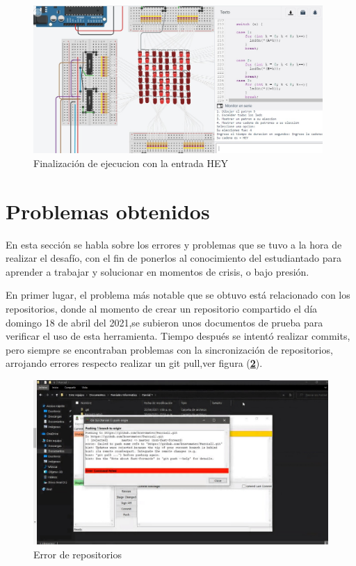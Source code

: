 \documentclass{article}
\begin{document}
       \begin{figure}[h]
    \includegraphics[width=11cm]{montaje7.jpeg}
    \centering
    \caption{Finalización de ejecucion con la entrada HEY}
    \label{ejecucionH}
    \end{figure}


\section{Problemas obtenidos}\label{problem}
En esta sección se habla sobre los errores y problemas que se tuvo a la hora de realizar el desafío, con el fin de ponerlos al conocimiento del estudiantado para aprender a trabajar y solucionar en momentos de crisis, o bajo presión.

En primer lugar, el problema más notable que se obtuvo está relacionado con los repositorios, donde al momento de crear un repositorio compartido el día domingo 18 de abril del 2021,se subieron unos documentos de prueba para verificar el uso de esta herramienta. Tiempo después se intentó  realizar commits, pero siempre se encontraban problemas con la sincronización de repositorios, arrojando errores respecto realizar un git pull,ver figura (\textbf{\ref{repoerror}}).

    \begin{figure}[h]
    \includegraphics[width=15cm]{Error1.jpeg}
    \centering
    \caption{Error de repositorios}
    \label{repoerror}
    \end{figure}
    
\end{document}
